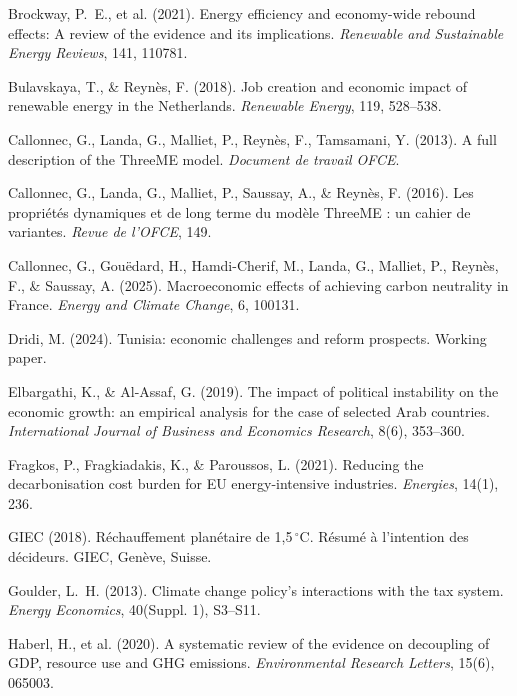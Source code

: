 \documentclass[12pt, a4paper]{article}
\begin{document}
\begin{enumerate}[label={[\arabic*]}, leftmargin=*]
\item Brockway, P.~E., et al. (2021). Energy efficiency and economy-wide rebound effects: A review of the evidence and its implications. \textit{Renewable and Sustainable Energy Reviews}, 141, 110781.

\item Bulavskaya, T., \& Reynès, F. (2018). Job creation and economic impact of renewable energy in the Netherlands. \textit{Renewable Energy}, 119, 528--538.

\item Callonnec, G., Landa, G., Malliet, P., Reynès, F., Tamsamani, Y. (2013). A full description of the ThreeME model. \textit{Document de travail OFCE}.

\item Callonnec, G., Landa, G., Malliet, P., Saussay, A., \& Reynès, F. (2016). Les propriétés dynamiques et de long terme du modèle ThreeME : un cahier de variantes. \textit{Revue de l'OFCE}, 149.

\item Callonnec, G., Gouëdard, H., Hamdi-Cherif, M., Landa, G., Malliet, P., Reynès, F., \& Saussay, A. (2025). Macroeconomic effects of achieving carbon neutrality in France. \textit{Energy and Climate Change}, 6, 100131.

\item Dridi, M. (2024). Tunisia: economic challenges and reform prospects. Working paper.

\item Elbargathi, K., \& Al-Assaf, G. (2019). The impact of political instability on the economic growth: an empirical analysis for the case of selected Arab countries. \textit{International Journal of Business and Economics Research}, 8(6), 353--360.

\item Fragkos, P., Fragkiadakis, K., \& Paroussos, L. (2021). Reducing the decarbonisation cost burden for EU energy-intensive industries. \textit{Energies}, 14(1), 236.

\item GIEC (2018). Réchauffement planétaire de 1,5\,$^{\circ}$C. Résumé à l'intention des décideurs. GIEC, Genève, Suisse.

\item Goulder, L.~H. (2013). Climate change policy's interactions with the tax system. \textit{Energy Economics}, 40(Suppl. 1), S3--S11.

\item Haberl, H., et al. (2020). A systematic review of the evidence on decoupling of GDP, resource use and GHG emissions. \textit{Environmental Research Letters}, 15(6), 065003.


\end{enumerate}
\end{document}
